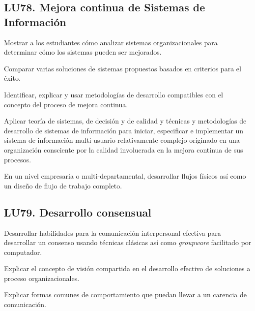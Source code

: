 \subsection{LU78. Mejora continua de Sistemas de Información}\label{sec:LU78}
\begin{LearningUnit}
\begin{LUGoal}
\item Mostrar a los estudiantes cómo analizar sistemas organizacionales para determinar cómo los sistemas pueden ser mejorados.
\end{LUGoal}

\begin{LUObjective}
\item Comparar varias soluciones de sistemas propuestos basados en criterios para el éxito.
\item Identificar, explicar y usar metodologías de desarrollo compatibles con el concepto del proceso de mejora continua.
\item Aplicar teoría de sistemas, de decisión y de calidad y técnicas y metodologías de desarrollo de sistemas de información para iniciar, especificar e implementar un sistema de información multi-usuario relativamente complejo originado en una organización consciente por la calidad involucrada en la mejora continua de sus procesos.
\item En un nivel empresaria o multi-departamental, desarrollar flujos físicos así como un diseño de flujo de trabajo completo.
\end{LUObjective}
\end{LearningUnit}

\subsection{LU79. Desarrollo consensual}\label{sec:LU79}
\begin{LearningUnit}
\begin{LUGoal}
\item Desarrollar habilidades para la comunicación interpersonal efectiva para desarrollar un consenso usando técnicas clásicas así como {\it groupware} facilitado por computador.
\end{LUGoal}

\begin{LUObjective}
\item Explicar el concepto de visión compartida en el desarrollo efectivo de soluciones a proceso organizacionales.
\item Explicar formas comunes de comportamiento que puedan llevar a un carencia de comunicación.
\end{LUObjective}
\end{LearningUnit}

